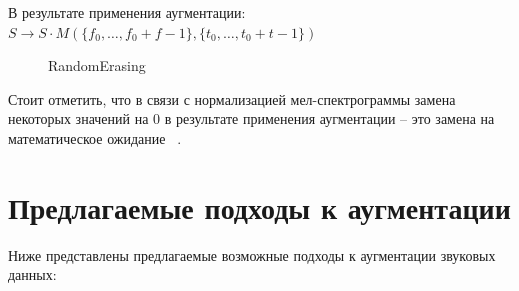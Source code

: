 \documentclass[12pt, fleqn]{article}
\begin{document}
\begin{enumerate}
		В результате применения аугментации: \newline
		$S \rightarrow S \cdot M(\{f_0, \ldots, f_0 + f - 1\}, \{ t_0, \ldots, t_0 + t - 1\}) $
		\begin{figure}[h]
			\caption{RandomErasing}
			\label{fig:i9}
		\end{figure}
	\end{enumerate}
	Стоит отметить, что в связи с нормализацией мел-спектрограммы замена некоторых значений на 0 в результате применения аугментации -- это замена на математическое ожидание ~\cite{b1}.
	\section{Предлагаемые подходы к аугментации}
	
	Ниже представлены предлагаемые возможные подходы к аугментации звуковых данных:
	
\end{document}
